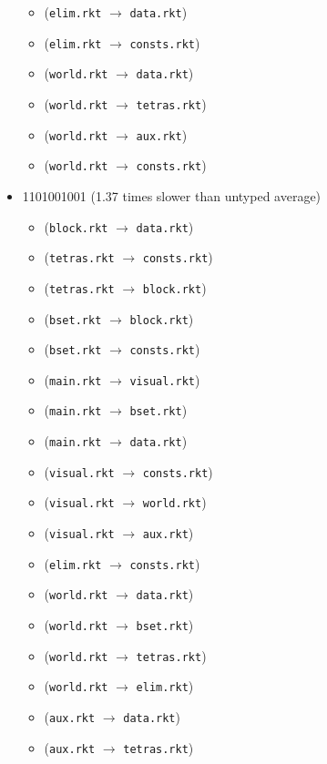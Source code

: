 \documentclass{article}
\newcommand{\mono}[1]{\texttt{#1}}
\begin{document}
\begin{itemize}
\begin{itemize}
  \item (\mono{elim.rkt} $\rightarrow$ \mono{data.rkt})
  \item (\mono{elim.rkt} $\rightarrow$ \mono{consts.rkt})
  \item (\mono{world.rkt} $\rightarrow$ \mono{data.rkt})
  \item (\mono{world.rkt} $\rightarrow$ \mono{tetras.rkt})
  \item (\mono{world.rkt} $\rightarrow$ \mono{aux.rkt})
  \item (\mono{world.rkt} $\rightarrow$ \mono{consts.rkt})
  \end{itemize}
\item 1101001001 (1.37 times slower than untyped average)
  \begin{itemize}
  \item (\mono{block.rkt} $\rightarrow$ \mono{data.rkt})
  \item (\mono{tetras.rkt} $\rightarrow$ \mono{consts.rkt})
  \item (\mono{tetras.rkt} $\rightarrow$ \mono{block.rkt})
  \item (\mono{bset.rkt} $\rightarrow$ \mono{block.rkt})
  \item (\mono{bset.rkt} $\rightarrow$ \mono{consts.rkt})
  \item (\mono{main.rkt} $\rightarrow$ \mono{visual.rkt})
  \item (\mono{main.rkt} $\rightarrow$ \mono{bset.rkt})
  \item (\mono{main.rkt} $\rightarrow$ \mono{data.rkt})
  \item (\mono{visual.rkt} $\rightarrow$ \mono{consts.rkt})
  \item (\mono{visual.rkt} $\rightarrow$ \mono{world.rkt})
  \item (\mono{visual.rkt} $\rightarrow$ \mono{aux.rkt})
  \item (\mono{elim.rkt} $\rightarrow$ \mono{consts.rkt})
  \item (\mono{world.rkt} $\rightarrow$ \mono{data.rkt})
  \item (\mono{world.rkt} $\rightarrow$ \mono{bset.rkt})
  \item (\mono{world.rkt} $\rightarrow$ \mono{tetras.rkt})
  \item (\mono{world.rkt} $\rightarrow$ \mono{elim.rkt})
  \item (\mono{aux.rkt} $\rightarrow$ \mono{data.rkt})
  \item (\mono{aux.rkt} $\rightarrow$ \mono{tetras.rkt})
  \end{itemize}

\end{itemize}
\end{document}
